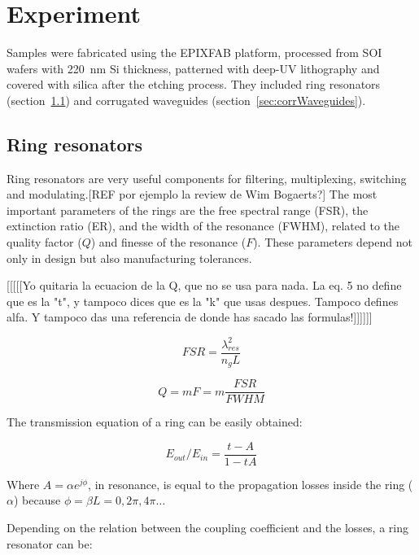 \documentclass[journal]{IEEEtran}
\begin{document}
\section{Experiment}
Samples were fabricated using the EPIXFAB platform, processed from SOI wafers with 220~nm Si thickness, patterned with deep-UV lithography and covered with silica after the etching process. They included ring resonators (section~\ref{sec:ringResonators}) and corrugated waveguides (section~\ref{sec:corrWaveguides}).


\subsection {Ring resonators}
\label{sec:ringResonators}
Ring resonators are very useful components for filtering, multiplexing, switching and modulating.[REF por ejemplo la review de Wim Bogaerts?] The most important parameters of the rings are the free spectral range (FSR), the extinction ratio (ER), and the width of the resonance (FWHM), related to the quality factor ($Q$) and finesse of the resonance ($F$). These parameters depend not only in design but also manufacturing tolerances.

[[[[[Yo quitaria la ecuacion de la Q, que no se usa para nada. La eq. 5 no define que es la "t", y tampoco dices que es la "k" que usas despues. Tampoco defines alfa. Y tampoco das una referencia de donde has sacado las formulas!]]]]]]

\begin{equation}
	FSR=\frac{\lambda_{res}^2}{n_gL}
	\label{eq:FSRanillo}
\end{equation} 

\begin{equation}
	Q=mF=m\frac{FSR}{FWHM}
\end{equation} 


The transmission equation of a ring can be easily obtained:

\begin{equation}
	E_{out}/E_{in}=\frac{t-A}{1-tA}
\label{eq:transmissionRing}
\end{equation}

Where $A=\alpha e^{j\phi}$, in resonance, is equal to the propagation losses inside the ring ($\alpha$) because $\phi=\beta L= 0,2\pi,4\pi\ldots$


Depending on the relation between the coupling coefficient and the losses, a ring resonator can be:
\end{document}
